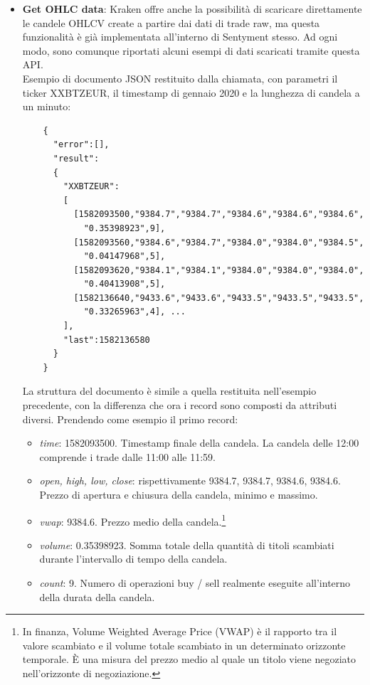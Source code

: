 \documentclass[a4paper,12pt]{report}
\begin{document}
\begin{itemize}
	\item \textbf{Get OHLC data}: Kraken offre anche la possibilità di scaricare direttamente le candele OHLCV create a partire dai dati di trade raw, ma questa funzionalità è già implementata all'interno di Sentyment stesso. Ad ogni modo, sono comunque riportati alcuni esempi di dati scaricati tramite questa API.\\
	Esempio di documento JSON restituito dalla chiamata, con parametri il ticker XXBTZEUR, il timestamp di gennaio 2020 e la lunghezza di candela a un minuto:
	\begin{verbatim}
	{
	  "error":[],
	  "result":
	  {
	    "XXBTZEUR":
	    [
	      [1582093500,"9384.7","9384.7","9384.6","9384.6","9384.6",
	        "0.35398923",9],
	      [1582093560,"9384.6","9384.7","9384.0","9384.0","9384.5",
	        "0.04147968",5],
	      [1582093620,"9384.1","9384.1","9384.0","9384.0","9384.0",
	        "0.40413908",5],
	      [1582136640,"9433.6","9433.6","9433.5","9433.5","9433.5",
	        "0.33265963",4], ...
	    ],
	    "last":1582136580
	  }
	} 
	\end{verbatim}
	
	La struttura del documento è simile a quella restituita nell'esempio precedente, con la differenza che ora i record sono composti da attributi diversi. Prendendo come esempio il primo record:
	\begin{itemize}
		\item \textit{time}: 1582093500. Timestamp finale della candela. La candela delle 12:00 comprende i trade dalle 11:00 alle 11:59.
		\item \textit{open, high, low, close}: rispettivamente 9384.7, 9384.7, 9384.6, 9384.6. Prezzo di apertura e chiusura della candela, minimo e massimo.
		\item \textit{vwap}: 9384.6. Prezzo medio della candela.\footnote{In finanza, Volume Weighted Average Price (VWAP) è il rapporto tra il valore scambiato e il volume totale scambiato in un determinato orizzonte temporale. È una misura del prezzo medio al quale un titolo viene negoziato nell'orizzonte di negoziazione.}
		\item \textit{volume}: 0.35398923. Somma totale della quantità di titoli scambiati durante l'intervallo di tempo della candela.
		\item \textit{count}: 9. Numero di operazioni buy / sell realmente eseguite all'interno della durata della candela.
	\end{itemize}


\end{itemize}
\end{document}
